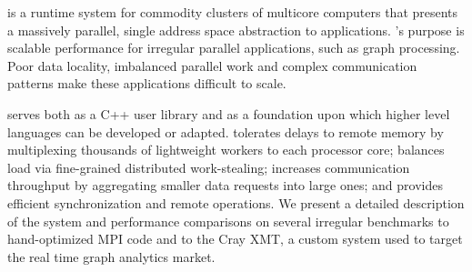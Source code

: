 \Grappa is a runtime system for commodity clusters of multicore computers that
presents a massively parallel, single address space abstraction to
applications. \Grappa's purpose is scalable performance for irregular
parallel applications, such as graph processing. Poor data locality, imbalanced parallel
work and complex communication patterns make these applications difficult to scale.

\Grappa serves both as a C++ user library and as a foundation upon which
higher level languages can be developed or adapted. \Grappa tolerates delays
to remote memory by multiplexing thousands of lightweight workers
to each processor core; balances load via fine-grained distributed
work-stealing; increases communication throughput by aggregating
smaller data requests into large ones; and provides efficient synchronization
and remote operations. We present a detailed description of the \Grappa
system and
performance comparisons on several irregular benchmarks to hand-optimized MPI code and to
the Cray XMT, a custom system used to target the real time graph analytics
market.
